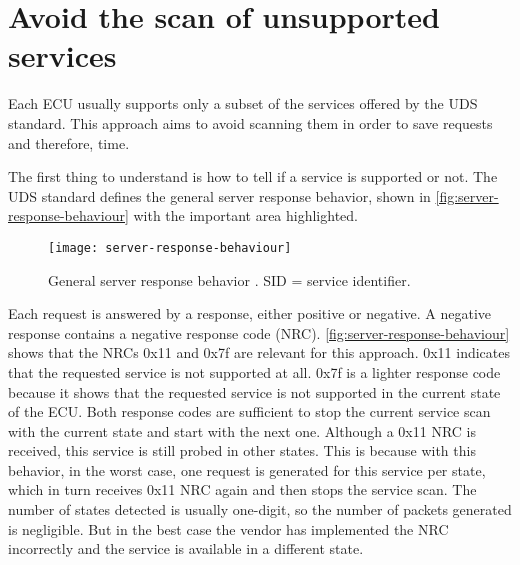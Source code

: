 \section{Avoid the scan of unsupported services}
\label{subsec:unsupported-services-elaboration}

Each ECU usually supports only a subset of the services offered  by the UDS standard. This approach aims to avoid scanning them in order to save requests and therefore, time.

The first thing to understand is how to tell if a service is supported or not. The UDS standard defines the general server response behavior, shown in \autoref{fig:server-response-behaviour} with the important area highlighted.

\begin{figure}[htb]
    \centering
    \texttt{[image: server-response-behaviour]}
    \caption{General server response behavior \cite{iso14229}. SID = service identifier.}
    \label{fig:server-response-behaviour}
\end{figure}

Each request is answered by a response, either positive or negative. A negative response contains a negative response code (NRC). \autoref{fig:server-response-behaviour} shows that the NRCs 0x11 and 0x7f are relevant for this approach. 0x11 indicates that the requested service is not supported at all. 0x7f is a lighter response code because it shows that the requested service is not supported in the current state of the ECU. Both response codes are sufficient to stop the current service scan with the current state and start with the next one. Although a 0x11 NRC is received, this service is still probed in other states. This is because with this behavior, in the worst case, one request is generated for this service per state, which in turn receives 0x11 NRC again and then stops the service scan. The number of states detected is usually one-digit, so the number of packets generated is negligible. But in the best case the vendor has implemented the NRC incorrectly and the service is available in a different state.
